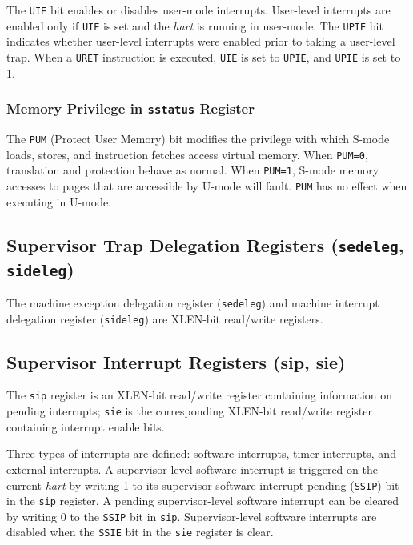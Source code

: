 The \texttt{UIE} bit enables or disables user-mode interrupts. User-level
interrupts are enabled only if \texttt{UIE} is set and the \emph{hart} is running
in user-mode. The \texttt{UPIE} bit indicates whether user-level interrupts were
enabled prior to taking a user-level trap. When a \texttt{URET} instruction is
executed, \texttt{UIE} is set to \texttt{UPIE}, and \texttt{UPIE} is set to 1.

\subsubsection{Memory Privilege in \texttt{sstatus} Register
}\label{memory-privilege-in-sstatus-register}

The \texttt{PUM} (Protect User Memory) bit modifies the privilege with which
S-mode loads, stores, and instruction fetches access virtual memory.
When \texttt{PUM=0}, translation and protection behave as normal. When \texttt{PUM=1},
S-mode memory accesses to pages that are accessible by U-mode will fault. \texttt{PUM} has no effect when executing in U-mode.

\subsection{Supervisor Trap Delegation Registers (\texttt{sedeleg},
\texttt{sideleg})}\label{supervisor-trap-delegation-registers-sedeleg-sideleg}

The machine exception delegation register (\texttt{sedeleg}) and machine
interrupt delegation register (\texttt{sideleg}) are XLEN-bit read/write
registers.

\subsection{Supervisor Interrupt Registers (sip, sie)}

The \texttt{sip} register is an XLEN-bit read/write register containing
information on pending interrupts; \texttt{sie} is the corresponding XLEN-bit
read/write register containing interrupt enable bits.



Three types of interrupts are defined: software interrupts, timer
interrupts, and external interrupts. A supervisor-level software
interrupt is triggered on the current \emph{hart} by writing 1 to its
supervisor software interrupt-pending (\texttt{SSIP}) bit in the \texttt{sip} register. A
pending supervisor-level software interrupt can be cleared by writing 0
to the \texttt{SSIP} bit in \texttt{sip}. Supervisor-level software interrupts are
disabled when the \texttt{SSIE} bit in the \texttt{sie} register is clear.

